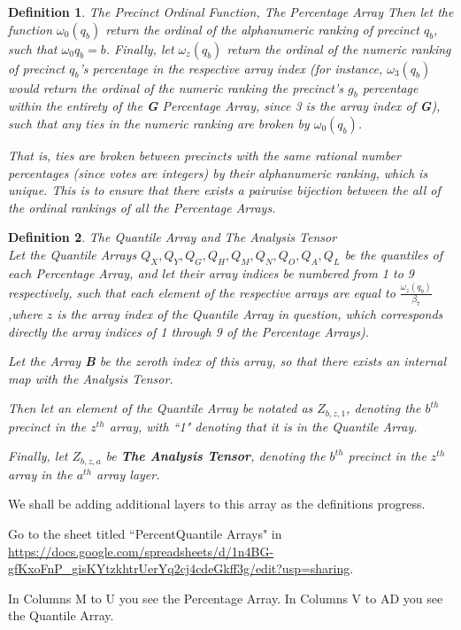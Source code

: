 \documentclass[preprint,13pt]{elsarticle}
\newtheorem{definition}{Definition}[section]
\begin{document}
\begin{definition}{The Precinct Ordinal Function, The Percentage Array}
Then let the function $\omega_{0}(q_{b})$ return the ordinal of the alphanumeric ranking of precinct $q_{b}$, such that $\omega_0{q_{b}}=b$.
\newpage
Finally, let $\omega_{z}(q_{b})$ return the ordinal of the numeric ranking of precinct $q_{b}$'s percentage in the respective array index (for instance, $\omega_{3}(q_{b})$ would return the ordinal of the numeric ranking the precinct's $g_{b}$ percentage within the entirety of the \textbf{G} Percentage Array, since 3 is the array index of \textbf{G}), such that any ties in the numeric ranking are broken by $\omega_{0}(q_{b})$. 

That is, ties are broken between precincts with the same rational number percentages (since votes are integers) by their alphanumeric ranking, which is unique. This is to ensure that there exists a pairwise bijection between the all of the ordinal rankings of all the Percentage Arrays.
\end{definition}

\begin{definition}{The Quantile Array and The Analysis Tensor}\\
Let the Quantile Arrays $Q_{X},Q_{Y},Q_{G},Q_{H},Q_{M},Q_{N},Q_{O},Q_{A},Q_{L}$ be the quantiles of each Percentage Array, and let their array indices be numbered from 1 to 9 respectively, such that each element of the respective arrays are equal to $\frac{\omega_{z}(q_{b})}{\beta_{7}}$ ,where $z$ is the array index of the Quantile Array in question, which corresponds directly the array indices of 1 through 9 of the Percentage Arrays).

Let the Array \textbf{B} be the zeroth index of this array, so that there exists an internal map with the Analysis Tensor.

Then let an element of the Quantile Array be notated as $Z_{b,z,1}$, denoting the $b^{th}$ precinct in the $z^{th}$ array, with ``1" denoting that it is in the Quantile Array.

Finally, let $Z_{b,z,a}$ be \textbf{The Analysis Tensor}, denoting the  $b^{th}$ precinct in the $z^{th}$ array in the $a^{th}$ array layer. 
\end{definition}

We shall be adding additional layers to this array as the definitions progress.

Go to the sheet titled ``PercentQuantile Arrays" in \url{https://docs.google.com/spreadsheets/d/1n4BG-gfKxoFnP_gisKYtzkhtrUerYq2cj4cdeGkff3g/edit?usp=sharing}.

In Columns M to U you see the Percentage Array. In Columns V to AD you see the Quantile Array.
\end{document}
